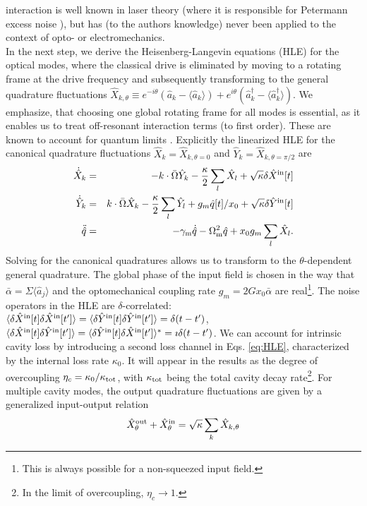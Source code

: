 \documentclass[twocolumn,english,aps,prl,superscriptaddress,showpacs,preprintnumbers]{revtex4}
\begin{document}
interaction is well known in laser theory (where it is responsible
for Petermann excess noise \cite{siegmann_excess_1989}), but has (to the authors knowledge) never
been applied to the context of opto- or electromechanics.\\
In the next step, we derive the Heisenberg-Langevin equations
(HLE) for the optical modes, where the classical drive is eliminated by moving to a rotating frame at the drive
frequency and subsequently transforming to the general quadrature
fluctuations $\hat{X}_{k,\theta}\equiv e^{-i\theta}(\hat{a}_{k}-\langle\hat{a}_{k}\rangle)+e^{i\theta}(\hat{a}_{k}^{\dagger}-\langle\hat{a}_{k}^{\dagger}\rangle)$.
We emphasize, that choosing one global rotating frame for all modes
is essential, as it enables us to treat off-resonant interaction terms
(to first order). These are known to account for quantum limits \cite{Dobrindt_parametric_2008}.
Explicitly the linearized HLE for the canonical quadrature fluctuations
$\hat{X}_{k}=\hat{X}_{k,\theta=0}$ and $\hat{Y}_{k}=\hat{X}_{k,\theta=\pi/2}$
are\begin{eqnarray}
\dot{\hat{X}}_{k} & = & -k\cdot\bar{\Omega}\hat{Y}_{k}-\frac{\kappa}{2}\sum_{l}\hat{X}_{l}+\sqrt{\kappa}\delta\hat{X}^{{\rm in}}[t]\nonumber \\
\dot{\hat{Y}}_{k} & = & k\cdot\bar{\Omega}\hat{X}_{k}-\frac{\kappa}{2}\sum_{l}\hat{Y}_{l}+g_{m}\hat{q}[t]/x_{0}+\sqrt{\kappa}\delta\hat{Y}^{{\rm in}}[t]\nonumber \\
\ddot{\hat{q}} & = & -\gamma_{\rm{m}}\dot{\hat{q}}-\Omega_{\rm{m}}^{2}\hat{q}+x_{0}g_{m}\sum_{l}\hat{X}_{l}.\label{eq:HLE}\end{eqnarray}
Solving for the canonical quadratures allows us to transform to the
$\theta$-dependent general quadrature. The global phase of the input
field is chosen in the way that $\bar{\alpha}=\Sigma\langle\hat{a}_{j}\rangle$
and the optomechanical coupling rate $g_{m}=2Gx_{0}\bar{\alpha}$
are real\footnote{This is always possible for a non-squeezed input field.}. The noise operators in the HLE are $\delta$-correlated: $\langle\delta\hat{X}^{{\rm in}}[t]\delta\hat{X}^{{\rm in}}[t^{\prime}]\rangle=\langle\delta\hat{Y}^{{\rm in}}[t]\delta\hat{Y}^{{\rm in}}[t^{\prime}]\rangle=\delta(t-t')$,
$\langle\delta\hat{X}^{{\rm in}}[t]\delta\hat{Y}^{{\rm in}}[t^{\prime}]\rangle=\langle\delta\hat{Y}^{{\rm in}}[t]\delta\hat{X}^{{\rm in}}[t^{\prime}]\rangle^{\ast}=\imath\delta(t-t')$.
We can account for intrinsic cavity loss by introducing a second loss
channel in Eqs. \ref{eq:HLE}, characterized by the internal loss
rate $\kappa_{0}$. It will appear in the results as the degree of
overcoupling $\eta_{c}=\kappa_{0}/\kappa_{{\rm tot}}$, with $\kappa_{{\rm tot}}$
being the total cavity decay rate\footnote{In the limit of overcoupling, $\eta_{c}\to1$.}. For multiple cavity modes, the output quadrature fluctuations are
given by a generalized input-output relation \cite{viviescas_field_2003}
\begin{equation}
\hat{X}_{\theta}^{{\rm out}}+\hat{X}_{\theta}^{{\rm in}}=\sqrt{\kappa}\sum_{k}\hat{X}_{k,\theta}\label{eq:multiIO}\end{equation}
\end{document}
